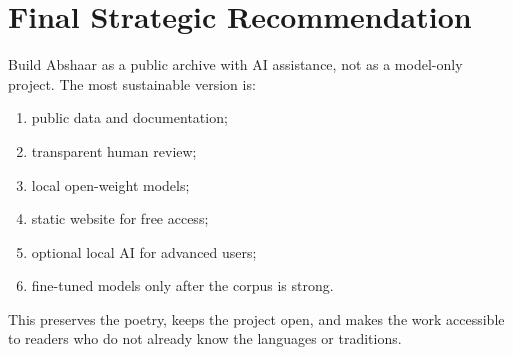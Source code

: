 \documentclass[11pt]{article}
\begin{document}
\section{Final Strategic Recommendation}

Build Abshaar as a public archive with AI assistance, not as a model-only
project. The most sustainable version is:

\begin{enumerate}
  \item public data and documentation;
  \item transparent human review;
  \item local open-weight models;
  \item static website for free access;
  \item optional local AI for advanced users;
  \item fine-tuned models only after the corpus is strong.
\end{enumerate}

This preserves the poetry, keeps the project open, and makes the work accessible
to readers who do not already know the languages or traditions.
\end{document}
